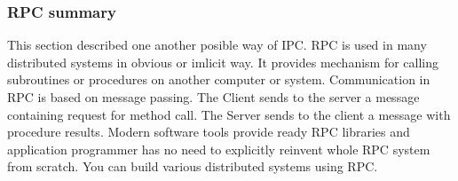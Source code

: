 \subsubsection{RPC summary}
This section described one another posible way of \gls{IPC}. RPC is used in many
distributed systems in obvious or imlicit way. It provides mechanism for calling 
subroutines or procedures on another computer or system. 
Communication in RPC is based on message passing.
The Client sends to the server a message containing request for method call.
The Server sends to the client a message with procedure results.
Modern software tools provide ready RPC libraries and application programmer has no need to explicitly reinvent whole RPC system from scratch.
You can build various distributed systems using RPC.
 


